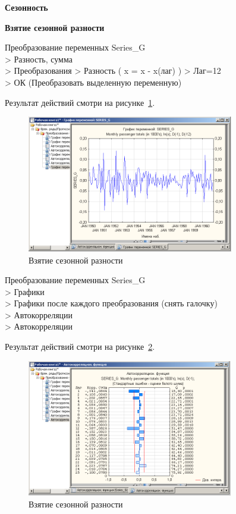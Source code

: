 \newpage

\begin{center}
  \textbf{Сезонность}
\end{center}

\begin{center}
  \textbf{Взятие сезонной разности}
\end{center}

Преобразование переменных Series\_G\\
> Разность, сумма\\
> Преобразования  > Разность ( x = x - x(лаг) ) > Лаг=12\\
> ОК (Преобразовать выделенную переменную)

Результат действий смотри на рисунке~\ref{fig:8}.

\begin{figure}[!h]
  \centering

  \includegraphics[height=6cm]
  {inc/8.PNG}

  \caption{Взятие сезонной разности}

  \label{fig:8}
\end{figure}

Преобразование переменных Series\_G\\
> Графики\\
> Графики после каждого преобразования (снять галочку)\\
> Автокорреляции\\
> Автокорреляции

Результат действий смотри на рисунке~\ref{fig:9}.

\begin{figure}[!h]
  \centering

  \includegraphics[height=6cm]
  {inc/9.PNG}

  \caption{Взятие сезонной разности}

  \label{fig:9}
\end{figure}

